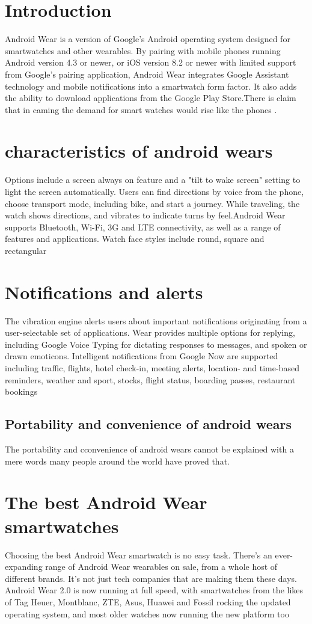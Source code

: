 \documentclass[9pt,a4paper]{article}
\begin{document}
\section{Introduction}
Android Wear is a version of Google's Android operating system designed for smartwatches and other wearables\cite{one}. By pairing with mobile phones running Android version 4.3 or newer, or iOS version 8.2 or newer with limited support from Google's pairing application, Android Wear integrates Google Assistant technology and mobile notifications into a smartwatch form factor. It also adds the ability to download applications from the Google Play Store\cite{one}.There is claim that in caming the demand for smart watches would rise like the phones .
\section{characteristics  of android wears}
Options include a screen always on feature and a "tilt to wake screen" setting to light the screen automatically\cite{four}.
Users can find directions by voice from the phone, choose transport mode, including bike, and start a journey. While traveling, the watch shows directions, and vibrates to indicate turns by feel.Android Wear supports Bluetooth\cite{ten}, Wi-Fi, 3G and LTE connectivity, as well as a range of features and applications. Watch face styles include round, square and rectangular\cite{nine}
\section{Notifications and alerts}
The vibration engine alerts users about important notifications originating from a user-selectable set of applications. Wear provides multiple options for replying, including Google Voice Typing for dictating responses to messages\cite{one}, and spoken or drawn emoticons.
Intelligent notifications from Google Now are supported including traffic, flights, hotel check-in, meeting alerts, location- and time-based reminders, weather and sport, stocks, flight status, boarding passes, restaurant bookings
\subsection{Portability and convenience of android wears}
The  portability and cconvenience of android wears cannot be explained with a mere words many people around the world have proved\cite{two} 
that.
\section{The best Android Wear smartwatches}
Choosing the best Android Wear smartwatch is no easy task\cite{six}. There's an ever-expanding range of Android Wear wearables on sale, from a whole host of different brands. It's not just tech companies that are making them these days.
Android Wear 2.0 is now running at full speed, with smartwatches from the likes of Tag Heuer\cite{eight}, Montblanc\cite{seven}, ZTE, Asus, Huawei and Fossil rocking the updated operating system, and most older watches now running the new platform too
\end{document}

